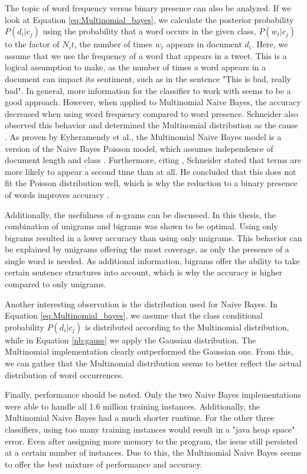 The topic of word frequency versus binary presence can also be analyzed. If we look at Equation \eqref{eq:Multinomial_bayes}, we calculate the posterior probability $P(d_i|c_j)$ using the probability that a word occurs in the given class, $P(w_t|c_j)$ to the factor of $N_it$, the number of times $w_t$ appears in document $d_i$. Here, we assume that we use the frequency of a word that appears in a tweet. This is a logical assumption to make, as the number of times a word appears in a document can impact its sentiment, such as in the sentence "This is bad, really bad". In general, more information for the classifier to work with seems to be a good approach. However, when applied to Multinomial Naive Bayes, the accuracy decreased when using word frequency compared to word presence. Schneider also observed this behavior and determined the Multinomial distribution as the cause \cite{nb_freq}. As proven by Eyheramendy et al., the Multinomial Naive Bayes model is a version of the Naive Bayes Poisson model, which assumes independence of document length and class \cite{Poisson}. Furthermore, citing \cite{Poisson_words}, Schneider stated that terms are more likely to appear a second time than at all. He concluded that this does not fit the Poisson distribution well, which is why the reduction to a binary presence of words improves accuracy \cite{nb_freq}.

Additionally, the usefulness of n-grams can be discussed. In this thesis, the combination of unigrams and bigrams was shown to be optimal. Using only bigrams resulted in a lower accuracy than using only unigrams. This behavior can be explained by unigrams offering the most coverage, as only the presence of a single word is needed. As additional information, bigrams offer the ability to take certain sentence structures into account, which is why the accuracy is higher compared to only unigrams.

Another interesting observation is the distribution used for Naive Bayes. In Equation \eqref{eq:Multinomial_bayes}, we assume that the class conditional probability $P(d_i|c_j)$ is distributed according to the Multinomial distribution, while in Equation \eqref{nb:gauss} we apply the Gaussian distribution. The Multinomial implementation clearly outperformed the Gaussian one. From this, we can gather that the Multinomial distribution seems to better reflect the actual distribution of word occurrences.

Finally, performance should be noted. Only the two Naive Bayes implementations were able to handle all 1.6 million training instances. Additionally, the Multinomial Naive Bayes had a much shorter runtime. For the other three classifiers, using too many training instances would result in a "java heap space" error. Even after assigning more memory to the program, the issue still persisted at a certain number of instances. Due to this, the Multinomial Naive Bayes seems to offer the best mixture of performance and accuracy.

